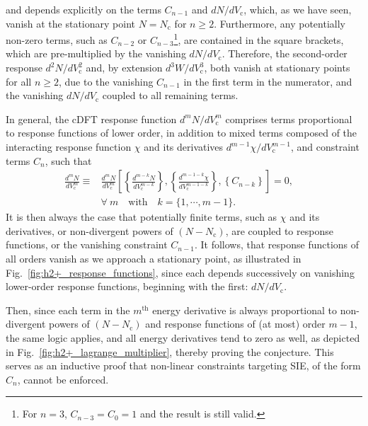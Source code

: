 %
and depends explicitly on the terms 
$C_{n-1}$ and $dN/dV_\textrm{c}$, 
which, as we have seen, 
vanish at the stationary point $N=N_\textrm{c}$ 
for $n\geq 2$.
%
Furthermore, 
any potentially non-zero terms, 
such as $C_{n-2}$ or 
$C_{n-3}$\footnote{For $n=3$, $C_{n-3}=C_0=1$ and the result is still valid.}, 
are contained in the square brackets, 
which are pre-multiplied by 
the vanishing $dN/dV_\textrm{c}$.
%
Therefore, 
the second-order response 
$d^2 N / d V_\textrm{c}^2 $ 
and, by extension 
$d^3 W / d V_\textrm{c}^3 $, 
both vanish at stationary points for all $n \ge 2$, 
due to the vanishing $C_{n-1}$
in the first term in the numerator, 
and the vanishing 
$dN/dV_\textrm{c}$ 
coupled to all remaining terms.


In general, 
the cDFT response function 
$d^m N / d V_\textrm{c}^m$ 
comprises terms proportional to 
response functions of lower order, 
in addition to mixed terms composed of 
the interacting response function $\chi$
and its derivatives 
$d^{m-1} \chi / d V_\textrm{c}^{m-1}$, 
and constraint terms $C_{n}$, 
such that 
%
\begin{align}
\frac{d^mN}{dV_\textrm{c}^m}\equiv&
\frac{d^mN}{dV_\textrm{c}^m}\left[\left\{\frac{d^{m-k}N}{dV_\textrm{c}^{m-k}}\right\},
\left\{\frac{d^{m-1-k}\chi}{dV_\textrm{c}^{m-1-k}}\right\},
\left\{C_{n-k}\right\}\right]=0, \quad \nonumber \\[0.5em]
&\forall\  m \quad \mbox{with}\quad
k=\{1,\cdots,m-1\}.
\end{align}
%
It is then always the case 
that potentially finite terms, 
such as $\chi$ and its derivatives, 
or non-divergent powers of $(N-N_\textrm{c})$, 
are coupled to response functions, 
or the vanishing constraint $C_{n-1}$.
%
It follows, 
that response functions of all orders 
vanish as we approach a stationary point, 
as illustrated in Fig.~\ref{fig:h2+_response_functions}, 
since each depends successively on 
vanishing lower-order response functions, 
beginning with the first: $dN/dV_\textrm{c}$.

Then, 
since each term in the $m^{\textrm{th}}$ 
energy derivative is always
proportional to non-divergent powers of 
$(N-N_\textrm{c})$ 
and response functions of (at most) order $m-1$, 
the same logic applies, 
and all energy derivatives tend to zero as well, 
as depicted in Fig.~\ref{fig:h2+_lagrange_multiplier}, 
thereby proving the conjecture.
%
This serves as an inductive proof 
that non-linear constraints targeting SIE, 
of the form $C_n$, 
cannot be enforced.
%


